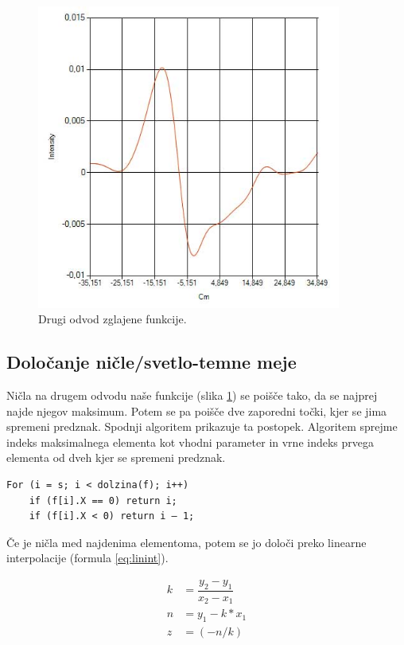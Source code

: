 \documentclass[oneside, a4paper, 12pt]{book}
\begin{document}
\begin{figure}
\begin{center}
\includegraphics[width=10cm]{slike/drugi-odvod-2.jpg}
\end{center}
\caption{Drugi odvod zglajene funkcije.}
\label{pic:d22}
\end{figure}

\subsection{Določanje ničle/svetlo-temne meje}

Ničla na drugem odvodu naše funkcije (slika \ref{pic:d22}) se poišče tako, da se najprej najde njegov maksimum. Potem  se pa poišče dve zaporedni točki, kjer se jima spremeni predznak. Spodnji algoritem prikazuje ta postopek. Algoritem sprejme indeks maksimalnega elementa kot vhodni parameter in vrne indeks prvega elementa od dveh kjer se spremeni predznak.

\begin{verbatim}
For (i = s; i < dolzina(f); i++)
    if (f[i].X == 0) return i;
    if (f[i].X < 0) return i – 1;
\end{verbatim}

Če je ničla med najdenima elementoma, potem se jo določi preko linearne interpolacije (formula \ref{eq:linint}).

\begin{align}
k &= \dfrac{y_2-y_1}{x_2-x_1}  \nonumber\\
n &= y_1-k*x_1 \nonumber \\
z &= (-n/k) \label{eq:linint}
\end{align} 
\end{document}
